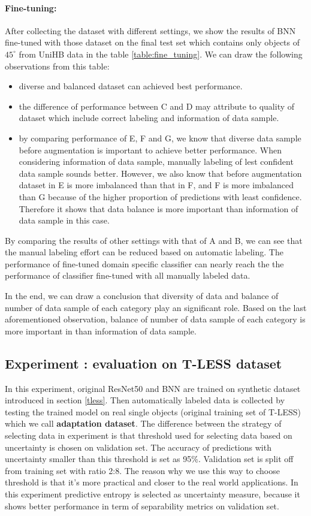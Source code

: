 \paragraph{Fine-tuning:} After collecting the dataset with different settings, we show the results of BNN fine-tuned with those dataset on the final test set which contains only objects of $45^{\circ}$ from UniHB data in the table \ref{table:fine_tuning}. We can draw the following observations from this table:
\begin{itemize}
	\item diverse and balanced dataset can achieved best performance.
	\item the difference of performance between C and D may attribute to quality of dataset which include correct labeling and information of data sample.
	\item by comparing performance of E, F and G, we know that diverse data sample before augmentation is important to achieve better performance. When considering information of data sample, manually labeling of lest confident data sample sounds better. However, we also know that before augmentation dataset in E is more imbalanced than that in F, and F is more imbalanced than G because of the higher proportion of predictions with least confidence. Therefore it shows that data balance is more important than information of data sample in this case.
\end{itemize}
By comparing the results of other settings with that of A and B, we can see that the manual labeling effort can be reduced based on automatic labeling.  The performance of fine-tuned domain specific classifier can nearly reach the the performance of classifier fine-tuned with all manually labeled data. 

In the end, we can draw a conclusion that diversity of data and balance of number of data sample of each category play an significant role. Based on the last aforementioned observation, balance of number of data sample of each category is more important in than information of data sample.

\subsection{Experiment : evaluation on T-LESS dataset} \label{con_learn_tless}
In this experiment, original ResNet50 and BNN are trained on synthetic dataset introduced in section \ref{tless}. Then automatically labeled data is collected by testing the trained model on real single objects (original training set of T-LESS) which we call \textbf{adaptation dataset}. The difference between the strategy of selecting data in experiment  is that threshold used for selecting data based on uncertainty is chosen on validation set. The accuracy of predictions with uncertainty smaller than this threshold is set as 95\%. Validation set is split off from training set with ratio 2:8. The reason why we use this way to choose threshold is that it's more practical and closer to the real world applications. In this experiment predictive entropy is selected as uncertainty measure, because it shows better performance in term of separability metrics on validation set.

